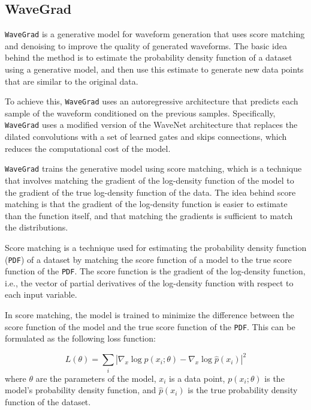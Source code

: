 \documentclass[runningheads]{llncs}
\begin{document}

\subsection{WaveGrad}

\texttt{WaveGrad} is a generative model for waveform generation that uses score matching and denoising to improve the quality of generated waveforms. The basic idea behind the method is to estimate the probability density function of a dataset using a generative model, and then use this estimate to generate new data points that are similar to the original data.

To achieve this, \texttt{WaveGrad} uses an autoregressive architecture that predicts each sample of the waveform conditioned on the previous samples. Specifically, \texttt{WaveGrad} uses a modified version of the WaveNet architecture that replaces the dilated convolutions with a set of learned gates and skips connections, which reduces the computational cost of the model.

\texttt{WaveGrad} trains the generative model using score matching, which is a technique that involves matching the gradient of the log-density function of the model to the gradient of the true log-density function of the data. The idea behind score matching is that the gradient of the log-density function is easier to estimate than the function itself, and that matching the gradients is sufficient to match the distributions.

Score matching is a technique used for estimating the probability density function (\texttt{PDF}) of a dataset by matching the score function of a model to the true score function of the \texttt{PDF}. The score function is the gradient of the log-density function, i.e., the vector of partial derivatives of the log-density function with respect to each input variable.

In score matching, the model is trained to minimize the difference between the score function of the model and the true score function of the \texttt{PDF}. This can be formulated as the following loss function:

\begin{equation}
L(\theta) = \sum_i |\nabla_x \log p(x_i; \theta) - \nabla_x \log \hat{p}(x_i)|^2
\end{equation}
where $\theta$ are the parameters of the model, $x_i$ is a data point, $p(x_i; \theta)$ is the model's probability density function, and $\hat{p}(x_i)$ is the true probability density function of the dataset.
\end{document}
